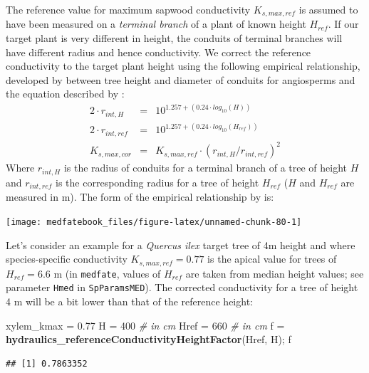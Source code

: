 \documentclass[]{book}
\newenvironment{Shaded}{\begin{snugshade}}{\end{snugshade}}
\newcommand{\KeywordTok}[1]{\textcolor[rgb]{0.13,0.29,0.53}{\textbf{#1}}}
\newcommand{\DecValTok}[1]{\textcolor[rgb]{0.00,0.00,0.81}{#1}}
\newcommand{\FloatTok}[1]{\textcolor[rgb]{0.00,0.00,0.81}{#1}}
\newcommand{\StringTok}[1]{\textcolor[rgb]{0.31,0.60,0.02}{#1}}
\newcommand{\CommentTok}[1]{\textcolor[rgb]{0.56,0.35,0.01}{\textit{#1}}}
\newcommand{\NormalTok}[1]{#1}
\begin{document}
The reference value for maximum sapwood conductivity \(K_{s,max,ref}\) is assumed to have been measured on a \emph{terminal branch} of a plant of known height \(H_{ref}\). If our target plant is very different in height, the conduits of terminal branches will have different radius and hence conductivity. We correct the reference conductivity to the target plant height using the following empirical relationship, developed by \citet{Olson2014} between tree height and diameter of conduits for angiosperms and the equation described by \citet{Christoffersen2016}:
\begin{eqnarray}
2 \cdot r_{int,H}&=& 10^{1.257+(0.24\cdot log_{10}(H))} \\
2 \cdot r_{int,ref}&=&10^{1.257+(0.24\cdot log_{10}(H_{ref}))}\\
K_{s,max,cor}&=&K_{s,max,ref}\cdot (r_{int,H}/r_{int,ref})^{2}
\end{eqnarray}
Where \(r_{int,H}\) is the radius of conduits for a terminal branch of a tree of height \(H\) and \(r_{int,ref}\) is the corresponding radius for a tree of height \(H_{ref}\) (\(H\) and \(H_{ref}\) are measured in m). The form of the empirical relationship by \citet{Olson2014} is:

\begin{center}\texttt{[image: medfatebook\_files/figure-latex/unnamed-chunk-80-1]} \end{center}

Let's consider an example for a \emph{Quercus ilex} target tree of 4m height and where species-specific conductivity \(K_{s,max,ref} = 0.77\) is the apical value for trees of \(H_{ref} = 6.6\) m (in \texttt{medfate}, values of \(H_{ref}\) are taken from median height values; see parameter \texttt{Hmed} in \texttt{SpParamsMED}). The corrected conductivity for a tree of height 4 m will be a bit lower than that of the reference height:

\begin{Shaded}
\begin{Highlighting}[]
\NormalTok{xylem_kmax =}\StringTok{ }\FloatTok{0.77}
\NormalTok{H =}\StringTok{ }\DecValTok{400} \CommentTok{# in cm}
\NormalTok{Href =}\StringTok{ }\DecValTok{660} \CommentTok{# in cm}
\NormalTok{f =}\StringTok{ }\KeywordTok{hydraulics_referenceConductivityHeightFactor}\NormalTok{(Href, H);}
\NormalTok{f}
\end{Highlighting}
\end{Shaded}

\begin{verbatim}
## [1] 0.7863352
\end{verbatim}
\end{document}
